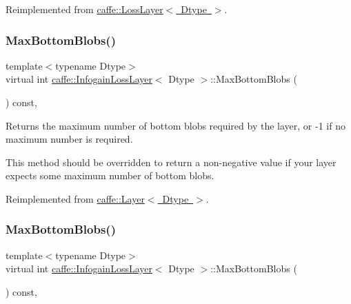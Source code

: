 Reimplemented from \mbox{\hyperlink{classcaffe_1_1_loss_layer_aa6fc7c2e90be66f1c1f0683637c949da}{caffe\+::\+Loss\+Layer$<$ Dtype $>$}}.

\mbox{\label{classcaffe_1_1_infogain_loss_layer_a9b2372959a16da1e80ae7a98b7689a4c}} 
\subsubsection{\texorpdfstring{Max\+Bottom\+Blobs()}{MaxBottomBlobs()}\hspace{0.1cm}{\footnotesize\ttfamily [1/2]}}
{\footnotesize\ttfamily template$<$typename Dtype$>$ \\
virtual int \mbox{\hyperlink{classcaffe_1_1_infogain_loss_layer}{caffe\+::\+Infogain\+Loss\+Layer}}$<$ Dtype $>$\+::Max\+Bottom\+Blobs (\begin{DoxyParamCaption}{ }\end{DoxyParamCaption}) const\hspace{0.3cm}{\ttfamily [inline]}, {\ttfamily [virtual]}}



Returns the maximum number of bottom blobs required by the layer, or -\/1 if no maximum number is required. 

This method should be overridden to return a non-\/negative value if your layer expects some maximum number of bottom blobs. 

Reimplemented from \mbox{\hyperlink{classcaffe_1_1_layer_af8bdc989053e0363ab032026b46de7c3}{caffe\+::\+Layer$<$ Dtype $>$}}.

\mbox{\label{classcaffe_1_1_infogain_loss_layer_a9b2372959a16da1e80ae7a98b7689a4c}} 
\subsubsection{\texorpdfstring{Max\+Bottom\+Blobs()}{MaxBottomBlobs()}\hspace{0.1cm}{\footnotesize\ttfamily [2/2]}}
{\footnotesize\ttfamily template$<$typename Dtype$>$ \\
virtual int \mbox{\hyperlink{classcaffe_1_1_infogain_loss_layer}{caffe\+::\+Infogain\+Loss\+Layer}}$<$ Dtype $>$\+::Max\+Bottom\+Blobs (\begin{DoxyParamCaption}{ }\end{DoxyParamCaption}) const\hspace{0.3cm}{\ttfamily [inline]}, {\ttfamily [virtual]}}



